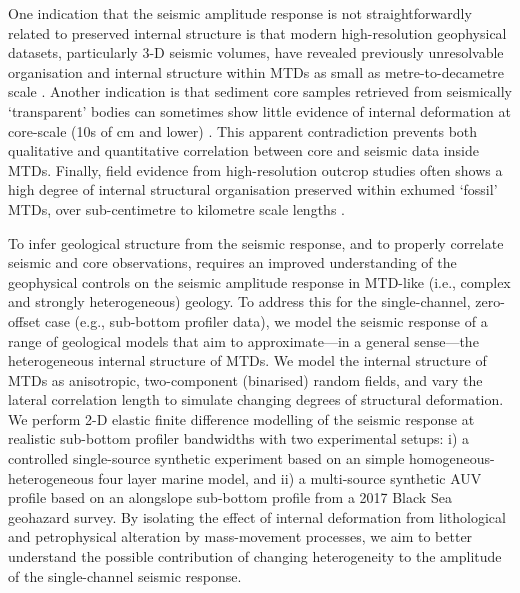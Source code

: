 \documentclass[se,manuscript]{copernicus}
\begin{document}
One indication that the seismic amplitude response is not straightforwardly related to preserved internal structure is that modern high-resolution geophysical datasets, particularly 3-D seismic volumes, have revealed previously unresolvable organisation and internal structure within MTDs as small as metre-to-decametre scale \citep{bull_review_2009,gafeira_3d_2010,alves_geomorphologic_2010,bellwald_shear_2018,badhani_integrated_2020,barrett_does_2021}.
Another indication is that sediment core samples retrieved from seismically `transparent' bodies can sometimes show little evidence of internal deformation at core-scale (10s of cm and lower) \citep[][Fig.~\ref{fig:black-sea-core}, this study]{expedition_316_scientists_expedition_2009, strasser_slumping_2011, sammartini_propagation_2021}.
This apparent contradiction prevents both qualitative and quantitative correlation between core and seismic data inside MTDs.
Finally, field evidence from high-resolution outcrop studies often shows a high degree of internal structural organisation preserved within exhumed `fossil' MTDs, over sub-centimetre to kilometre scale lengths \citep{lucente_anatomy_2003,lamarche_meso-scale_2016}.

To infer geological structure from the seismic response, and to properly correlate seismic and core observations, requires an improved understanding of the geophysical controls on the seismic amplitude response in MTD-like (i.e., complex and strongly heterogeneous) geology.
To address this for the single-channel, zero-offset case (e.g., sub-bottom profiler data), we model the seismic response of a range of geological models that aim to approximate---in a general sense---the heterogeneous internal structure of MTDs.
We model the internal structure of MTDs as anisotropic, two-component (binarised) random fields, and vary the lateral correlation length to simulate changing degrees of structural deformation.
We perform 2-D elastic finite difference modelling of the seismic response at realistic sub-bottom profiler bandwidths with two experimental setups: i) a controlled single-source synthetic experiment based on an simple homogeneous-heterogeneous four layer marine model, and ii) a multi-source synthetic AUV profile based on an alongslope sub-bottom profile from a 2017 Black Sea geohazard survey.
By isolating the effect of internal deformation from lithological and petrophysical alteration by mass-movement processes, we aim to better understand the possible contribution of changing heterogeneity to the amplitude of the single-channel seismic response.
\end{document}

